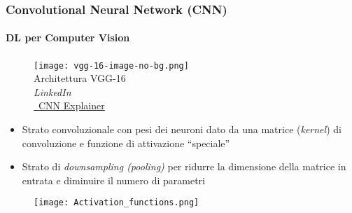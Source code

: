 \begin{frame}[t] \frametitle{Convolutional Neural Network (CNN)}
\framesubtitle{DL per Computer Vision}
{\scriptsize
	\vspace*{-.5cm}
	\begin{minipage}[t]{\textwidth}
		\begin{figure}[ht]
			\centering
			\texttt{[image: vgg-16-image-no-bg.png]}
			{\tiny\\Architettura VGG-16\\\textit{\textcopyright LinkedIn}\\\vspace*{-4pt}\href{https://poloclub.github.io/cnn-explainer/}{\faLink\ CNN Explainer}}
		\end{figure}
	\end{minipage}
	\begin{minipage}[t]{\textwidth}
		\vspace*{-.3cm}
		\begin{itemize}[leftmargin=10pt,align=right]
				\onslide<2->\item[\alert{\faHandORight}] \alert{Strato convoluzionale} con pesi dei neuroni dato da una matrice (\emph{kernel}) di convoluzione e funzione di attivazione ``speciale''
				\onslide<3->\item[\alert{\faHandORight}] \alert{Strato di \emph{downsampling (pooling)}} per ridurre la dimensione della matrice in entrata e diminuire il numero di parametri
			\end{itemize}
	\end{minipage}
	\begin{minipage}[t]{\textwidth}
		\vspace*{.3cm}
		\begin{figure}[ht]
			\centering
			\texttt{[image: Activation\_functions.png]}
		\end{figure}
	\end{minipage}
}
\end{frame}